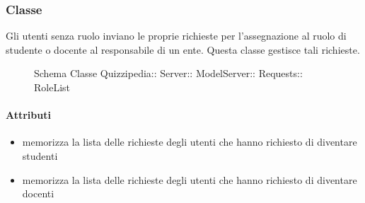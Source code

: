 \subsubsection{Classe }
Gli utenti senza ruolo inviano le proprie richieste per l'assegnazione al ruolo di studente o docente al responsabile di un ente. Questa classe gestisce tali richieste.
\begin{figure}[H]
\centering
\noindent{}
\caption[Schema Classe RoleList]{Schema Classe Quizzipedia:: Server:: ModelServer:: Requests:: RoleList}
\end{figure}
\paragraph{Attributi}
\begin{itemize}
\item {}
\newline
memorizza la lista delle richieste degli utenti che hanno richiesto di diventare studenti
\item {}
\newline
memorizza la lista delle richieste degli utenti che hanno richiesto di diventare docenti
\end{itemize}
